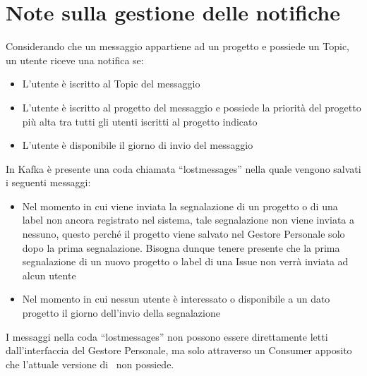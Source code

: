 \section{Note sulla gestione delle notifiche}\label{note}
Considerando che un messaggio appartiene ad un progetto e possiede un  Topic, un utente riceve una notifica se:
\begin{itemize}
    \item L'utente è iscritto al Topic del messaggio
    \item L'utente è iscritto al progetto del messaggio e possiede la priorità del progetto più alta tra tutti gli utenti iscritti al progetto indicato
    \item L'utente è disponibile il giorno di invio del messaggio
\end{itemize}
In Kafka è presente una coda chiamata ``lostmessages'' nella quale vengono salvati i seguenti messaggi:
\begin{itemize}
    \item Nel momento in cui viene inviata la segnalazione di un progetto o di una label non ancora registrato nel sistema, tale segnalazione non viene inviata a nessuno, questo perché il progetto viene salvato nel Gestore Personale solo dopo la prima segnalazione. Bisogna dunque tenere presente che la prima segnalazione di un nuovo progetto o label di una Issue non verrà inviata ad alcun utente
    \item Nel momento in cui nessun utente è interessato o disponibile a un dato progetto il giorno dell'invio della segnalazione 
\end{itemize}
I messaggi nella coda ``lostmessages'' non possono essere direttamente letti dall'interfaccia del Gestore Personale, ma solo attraverso un Consumer apposito che l'attuale versione di \progetto\ non possiede.

